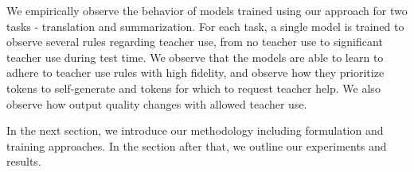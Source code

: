 We empirically observe the behavior of models trained using our approach for two tasks - translation and summarization. For each task, a single model is trained to observe several rules regarding teacher use, from no teacher use to significant teacher use during test time. We observe that the models are able to learn to adhere to teacher use rules with high fidelity, and observe how they prioritize tokens to self-generate and tokens for which to request teacher help. We also observe how output quality changes with allowed teacher use.

In the next section, we introduce our methodology including formulation and training approaches. In the section after that, we outline our experiments and results.
